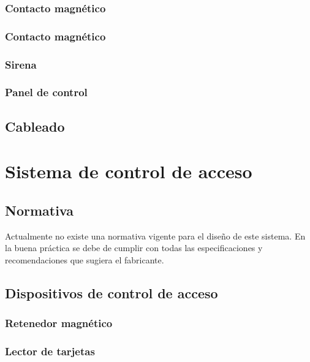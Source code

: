 \subsubsection{Contacto magnético}

\subsubsection{Contacto magnético}

\subsubsection{Sirena}

\subsubsection{Panel de control}


\subsection{Cableado}


\newpage


\section{Sistema de control de acceso}

\subsection{Normativa}

Actualmente no existe una normativa vigente para el diseño de este sistema. En la buena práctica se debe de cumplir con todas las especificaciones y recomendaciones que sugiera el fabricante.


\subsection{Dispositivos de control de acceso}


\subsubsection{Retenedor magnético}

\subsubsection{Lector de tarjetas}

